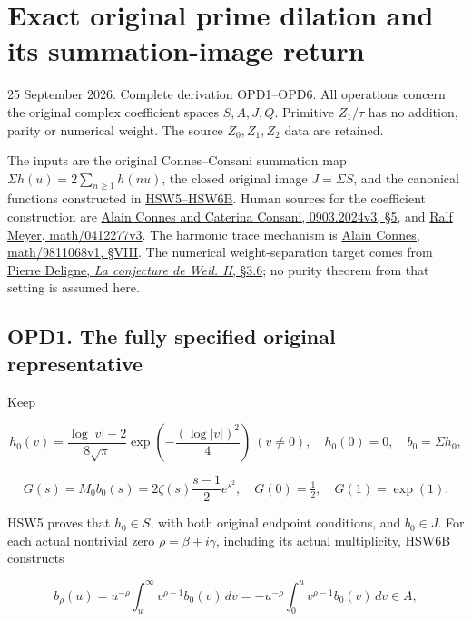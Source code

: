 \section{Exact original prime dilation and its summation-image
return}\label{exact-original-prime-dilation-and-its-summation-image-return}

25 September 2026. Complete derivation OPD1--OPD6. All operations
concern the original complex coefficient spaces \(S,A,J,Q\). Primitive
\(Z_1/\tau\) has no addition, parity or numerical weight. The source
\(Z_0,Z_1,Z_2\) data are retained.

The inputs are the original Connes--Consani summation map
\(\Sigma h(u)=2\sum_{n\ge1}h(nu)\), the closed original image
\(J=\Sigma S\), and the canonical functions constructed in
\href{https://github.com/KokunoYumeto/zeta-function-research-reader/blob/main/workbenches/splitzero-tandem/continuations/20260925-full-source-tensor-and-original-divisor/counterfactual/ORIGINAL_ZETA_HARMONIC_SWEEP_AND_OFFCRITICAL_DEFECT.md}{HSW5--HSW6B}.
Human sources for the coefficient construction are
\href{https://arxiv.org/abs/0903.2024v3}{Alain Connes and Caterina
Consani, 0903.2024v3, §5}, and
\href{https://arxiv.org/abs/math/0412277v3}{Ralf Meyer, math/0412277v3}.
The harmonic trace mechanism is
\href{https://arxiv.org/abs/math/9811068v1}{Alain Connes,
math/9811068v1, §VIII}. The numerical weight-separation target comes
from \href{https://www.numdam.org/item/PMIHES_1980__52__137_0/}{Pierre
Deligne, \emph{La conjecture de Weil. II}, §3.6}; no purity theorem from
that setting is assumed here.

\subsection{OPD1. The fully specified original
representative}\label{opd1.-the-fully-specified-original-representative}

Keep

\[
h_0(v)=\frac{\log|v|-2}{8\sqrt\pi}
\exp\!\left(-\frac{(\log|v|)^2}{4}\right)\ (v\ne0),
\quad h_0(0)=0,\quad b_0=\Sigma h_0,
\]

\[
G(s)=M_0b_0(s)=2\zeta(s)\frac{s-1}{2}e^{s^2},
\quad G(0)=\tfrac12,\quad G(1)=\exp(1).
\tag{OPD1.1}
\]

HSW5 proves that \(h_0\in S\), with both original endpoint conditions,
and \(b_0\in J\). For each actual nontrivial zero
\(\rho=\beta+i\gamma\), including its actual multiplicity, HSW6B
constructs

\[
b_\rho(u)=u^{-\rho}\int_u^\infty v^{\rho-1}b_0(v)\,dv
=-u^{-\rho}\int_0^u v^{\rho-1}b_0(v)\,dv\in A,
\]

